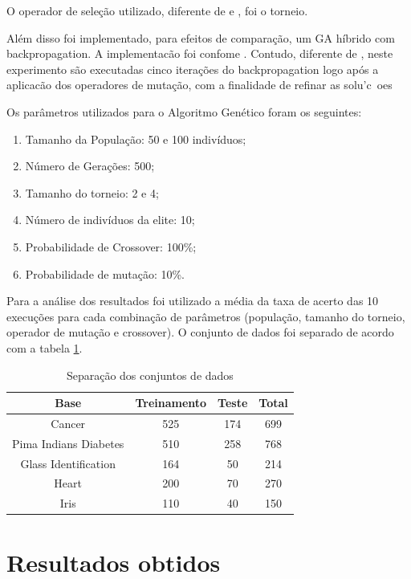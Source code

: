 \documentclass[12pt]{article}
\begin{document}
\par O operador de seleção utilizado, diferente de \cite{Liu} e \cite{montana}, foi o torneio. 


\par Além disso foi implementado, para efeitos de comparação, um GA híbrido com backpropagation. A implementacão foi confome \cite{freeman}. Contudo, diferente de \cite{Liu}, neste experimento são executadas cinco iterações do backpropagation logo após a aplicacão dos operadores de mutação, com a finalidade de refinar as solu'c~oes 

\par Os parâmetros utilizados para o Algoritmo Genético foram os seguintes:
\begin{enumerate}
	\item Tamanho da População: 50 e 100 indivíduos;
	\item Número de Gerações: 500;
	\item Tamanho do torneio: 2 e 4;
	\item Número de indivíduos da elite: 10;
	\item Probabilidade de Crossover: 100\%;
	\item Probabilidade de mutação: 10\%.
\end{enumerate}

\par Para a análise dos resultados foi utilizado a média da taxa de acerto das 10 execuções para cada combinação de parâmetros (população, tamanho do torneio, operador de mutação e crossover). O conjunto de dados foi separado de acordo com a tabela \ref{tab:db}.

\begin{table}
\center
\begin{tabular}{|c|c|c|c|}
\hline Base & Treinamento & Teste  & Total \\ 
\hline Cancer & 525 & 174 & 699 \\ 
\hline Pima Indians Diabetes & 510 & 258 & 768 \\ 
\hline Glass Identification & 164 & 50 & 214 \\ 
\hline Heart & 200 & 70 & 270 \\ 
\hline Iris & 110 & 40 & 150 \\ 
\hline 
\end{tabular} 
\caption{Separação dos conjuntos de dados}
\label{tab:db}
\end{table}


\section{Resultados obtidos}
\end{document}
